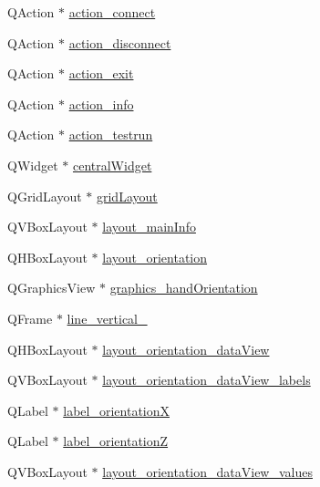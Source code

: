 \begin{DoxyCompactItemize}
\item 
Q\+Action $\ast$ \hyperlink{class_ui___main_window_a1b60f170f55f9d40d13fa28b5103ba37}{action\+\_\+connect}
\item 
Q\+Action $\ast$ \hyperlink{class_ui___main_window_a78f0ea39c6f7f4f41719a2dbdacf8af8}{action\+\_\+disconnect}
\item 
Q\+Action $\ast$ \hyperlink{class_ui___main_window_a26c24f8c42df49ebe9affd0aa3d09b34}{action\+\_\+exit}
\item 
Q\+Action $\ast$ \hyperlink{class_ui___main_window_aa4a173c56ec3157c8f3d1db471280081}{action\+\_\+info}
\item 
Q\+Action $\ast$ \hyperlink{class_ui___main_window_a5b6c6adc6f723746ea4536595e7be84d}{action\+\_\+testrun}
\item 
Q\+Widget $\ast$ \hyperlink{class_ui___main_window_a30075506c2116c3ed4ff25e07ae75f81}{central\+Widget}
\item 
Q\+Grid\+Layout $\ast$ \hyperlink{class_ui___main_window_a525ed3c5fe0784ac502ee222fba4e205}{grid\+Layout}
\item 
Q\+V\+Box\+Layout $\ast$ \hyperlink{class_ui___main_window_a624242184b0f9b5a81b6a6a000003c8c}{layout\+\_\+main\+Info}
\item 
Q\+H\+Box\+Layout $\ast$ \hyperlink{class_ui___main_window_ad750259ca98e0119c29ed06ade8a16ae}{layout\+\_\+orientation}
\item 
Q\+Graphics\+View $\ast$ \hyperlink{class_ui___main_window_a4cb84b8051e253e2faa9793c1d3ebb82}{graphics\+\_\+hand\+Orientation}
\item 
Q\+Frame $\ast$ \hyperlink{class_ui___main_window_afc3cd32127736948501dae4c97871ca0}{line\+\_\+vertical\+\_}
\item 
Q\+H\+Box\+Layout $\ast$ \hyperlink{class_ui___main_window_a3a7c11d7a9f55fed41b9c7b3092e6fff}{layout\+\_\+orientation\+\_\+data\+View}
\item 
Q\+V\+Box\+Layout $\ast$ \hyperlink{class_ui___main_window_aafc09f39b631c126c76a96dcac9aeaf4}{layout\+\_\+orientation\+\_\+data\+View\+\_\+labels}
\item 
Q\+Label $\ast$ \hyperlink{class_ui___main_window_aa909c7dd00c373551909b20f7095aa3a}{label\+\_\+orientationX}
\item 
Q\+Label $\ast$ \hyperlink{class_ui___main_window_ab0cf2891fe18f05d0ffdd926cefbf50c}{label\+\_\+orientationZ}
\item 
Q\+V\+Box\+Layout $\ast$ \hyperlink{class_ui___main_window_af8e40b40c17dc2a39ea84ea015dd4645}{layout\+\_\+orientation\+\_\+data\+View\+\_\+values}

\end{DoxyCompactItemize}
